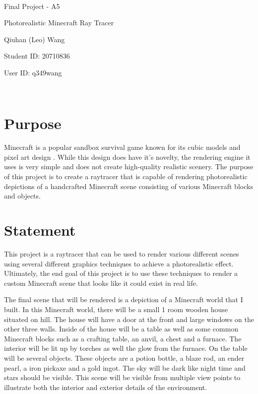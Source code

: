 \documentclass {article}
\begin{document}
~\vfill
\begin{center}
\Large

Final Project - A5

Photorealistic Minecraft Ray Tracer

Qiuhan (Leo) Wang

Student ID: 20710836

User ID: q349wang
\end{center}
\vfill ~\vfill~
\newpage
\section{Purpose}
Minecraft is a popular sandbox survival game known for its cubic models
and pixel art design \cite{Minecraft}. While this design does have it's novelty, the rendering
engine it uses is very simple and does not create high-quality realistic scenery. 
The purpose of this project is to create a raytracer that is
capable of rendering photorealistic depictions of a handcrafted Minecraft scene 
consisting of various Minecraft blocks and objects.
\section{Statement}
This project is a raytracer that can be used to render various different scenes
using several different graphics techniques to achieve a photorealistic effect. Ultimately, 
the end goal of this project is to use these techniques to render a custom Minecraft scene
that looks like it could exist in real life.\medskip
\par
The final scene that will be rendered is a depiction of a Minecraft world that
I built. In this Minecraft world, there will be a small 1 room wooden
house situated on hill. The house will have a door at the front and large windows on the
other three walls. Inside of the
house will be a table as well as some common Minecraft blocks such as
a crafting table, an anvil, a chest and a furnace. The interior will be lit up by torches as well
the glow from the furnace. On the table will be several objects. These objects
are a potion bottle, a blaze rod, an ender pearl, a iron pickaxe and a gold ingot.
The sky will be dark like night time and stars should be visible. This scene
will be visible from multiple view points to illustrate both the interior and exterior
details of the environment.
\end{document}
